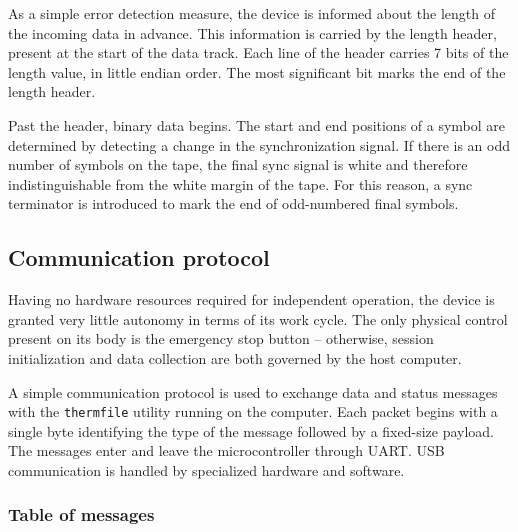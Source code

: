 \documentclass{article}
\begin{document}
	As a simple error detection measure, the device is informed about the
	length of the incoming data in advance. This information is carried by the
	length header, present at the start of the data track. Each line of the
	header carries 7 bits of the length value, in little endian order. The
	most significant bit marks the end of the length header.
	
	Past the header, binary data begins. The start and end positions of a
	symbol are determined by detecting a change in the synchronization signal.
	If there is an odd number of symbols on the tape, the final sync signal is
	white and therefore indistinguishable from the white margin of the tape.
	For this reason, a sync terminator is introduced to mark the end of
	odd-numbered final symbols.
	
	\subsection{Communication protocol}
	
	Having no hardware resources required for independent operation, the device
	is granted very little autonomy in terms of its work cycle. The only
	physical control present on its body is the emergency stop button --
	otherwise, session initialization and data collection are both governed by
	the host computer.
	
	A simple communication protocol is used to exchange data and status
	messages with the \texttt{thermfile} utility running on the computer. Each
	packet begins with a single byte identifying the type of the message
	followed by a fixed-size payload. The messages enter and leave the
	microcontroller through UART. USB communication is handled by specialized
	hardware and software.
	
	\newpage
	\subsubsection{Table of messages}
	
\end{document}
